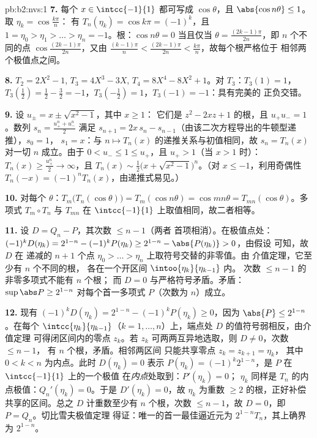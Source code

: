 \begin{solution}{pb:b2:nvs:1}
\textbf{7.} 每个 $x \in \intcc{-1}{1}$ 都可写成 $\cos\theta$，且
$\abs{\cos n\theta} \leq 1$。取 $\eta_k = \cos\frac{k\pi}n$：
有 $T_n(\eta_k) = \cos k\pi = (-1)^k$，且 $1 = \eta_0 > \eta_1 >
\dots > \eta_n = -1$。根：$\cos n\theta = 0$ 当且仅当 $\theta =
\frac{(2k-1)\pi}{2n}$，即 $n$ 个不同的点
$\cos\frac{(2k-1)\pi}{2n}$，又由 $\frac{(k-1)\pi}n <
\frac{(2k-1)\pi}{2n} < \frac{k\pi}n$，故每个根严格位于
相邻两个极值点之间。

\textbf{8.} $T_2 = 2X^2 - 1$, $T_3 = 4X^3 - 3X$, $T_4 = 8X^4 -
8X^2 + 1$。对 $T_3$：$T_3(1) = 1$，$T_3(\tfrac12) = \tfrac12 -
\tfrac32 = -1$，$T_3(-\tfrac12) = 1$，$T_3(-1) = -1$：具有完美的
正负交错。

\textbf{9.} 设 $u_\pm = x \pm \sqrt{x^2 - 1}$，其中 $x \geq 1$：
它们是 $z^2 - 2xz + 1$ 的根，且 $u_+u_- = 1$。数列
$s_n = \frac{u_+^n + u_-^n}2$ 满足 $s_{n+1} = 2x\,s_n -
s_{n-1}$（由该二次方程导出的牛顿型递推），$s_0 = 1$，
$s_1 = x$：与 $n \mapsto
T_n(x)$ 的递推关系与初值相同，故 $s_n = T_n(x)$ 对一切 $n$ 成立。由于 $0 < u_- \leq 1
\leq u_+$，且 $u_+ > 1$（当 $x > 1$ 时）：$T_n(x) \geq
\frac{u_+^n}2 \to \infty$，且 $T_n(x) \sim \frac12\bigl(x +
\sqrt{x^2-1}\bigr)^n$。（对 $x \leq -1$，利用奇偶性 $T_n(-x)
= (-1)^nT_n(x)$，由递推式易见。）

\textbf{10.} 对每个 $\theta$：$T_m\bigl(T_n(\cos\theta)\bigr)
= T_m(\cos n\theta) = \cos mn\theta =
T_{mn}(\cos\theta)$。多项式 $T_m \circ T_n$ 与
$T_{mn}$ 在 $\intcc{-1}{1}$ 上取值相同，故二者相等。

\textbf{11.} 设 $D = Q_n - P$，其次数 $\leq n - 1$（两者
首项相消）。在极值点处：$(-1)^kD(\eta_k) =
2^{1-n} - (-1)^kP(\eta_k) \geq 2^{1-n} - \abs{P(\eta_k)} > 0$，由假设
可知，故 $D$ 在
递减的 $n + 1$ 个点 $\eta_0 > \dots > \eta_n$ 上取符号交替的非零值。由
介值定理，它至少有 $n$ 个不同的根，
各在一个开区间 $\intoo{\eta_{k}}{\eta_{k-1}}$ 内。
次数 $\leq n - 1$ 的非零多项式不能有 $n$ 个根；
而 $D = 0$ 与严格符号矛盾。矛盾：
$\sup\abs P \geq 2^{1-n}$ 对每个首一多项式 $P$（次数为 $n$）成立。

\textbf{12.} 现有 $(-1)^kD(\eta_k) = 2^{1-n} - (-1)^kP(\eta_k)
\geq 0$，因为 $\abs{P} \leq 2^{1-n}$。在每个
$\intcc{\eta_k}{\eta_{k-1}}$（$k = 1, \dots, n$）上，端点处
$D$ 的值符号弱相反，由介值定理
可得闭区间内的零点 $z_k$。若 $z_k$
可两两互异地选取，则 $D \neq 0$，次数 $\leq n-1$，
有 $n$ 个根，矛盾。相邻两区间
只能共享零点 $z_k = z_{k+1} = \eta_k$，
其中 $0 < k < n$ 为内点。此时 $D(\eta_k) = 0$ 表示 $P(\eta_k) =
(-1)^k2^{1-n}$，是 $P$ 在 $\intcc{-1}{1}$ 上的一个极值
在\emph{内点}处取到：$P'(\eta_k) = 0$；
$\eta_k$ 同样是 $T_n$ 的内点极值：$Q_n'(\eta_k) =
0$。于是 $D'(\eta_k) = 0$，故 $\eta_k$ 为重数
$\geq 2$ 的根，正好补偿共享的区间。总之 $D$
计重数至少有 $n$ 个根，次数 $\leq n -
1$，故 $D = 0$，即 $P = Q_n$。切比雪夫极值定理
得证：唯一的首一最佳逼近元为 $2^{1-n}T_n$，其上确界
为 $2^{1-n}$。


\end{solution}
